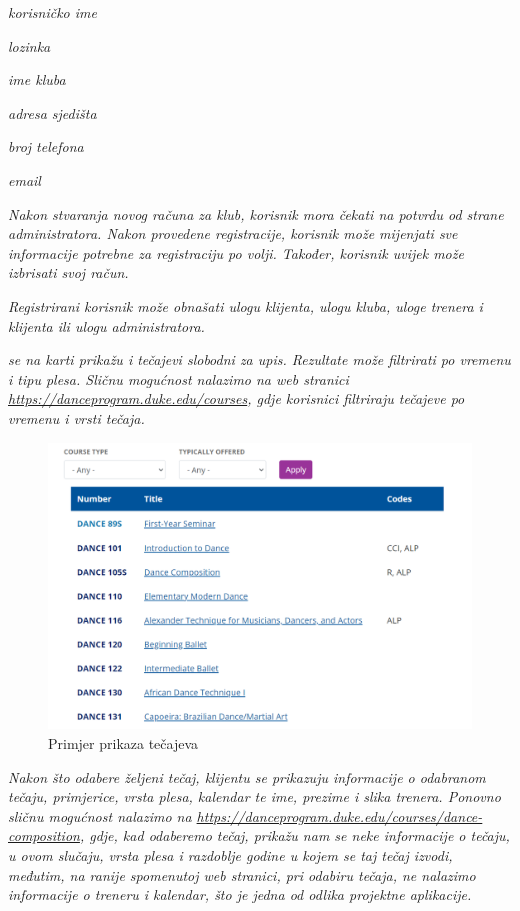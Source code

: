 \begin{packed_item}
	\item \textit{korisničko ime}
	\item \textit{lozinka}
	\item \textit{ime kluba}
	\item \textit{adresa sjedišta}
	\item \textit{broj telefona}
	\item \textit{email}
\end{packed_item}

\textit{Nakon stvaranja novog računa za klub, korisnik mora čekati na potvrdu od strane administratora.  Nakon provedene registracije, korisnik može mijenjati sve informacije potrebne za registraciju po volji. Također, korisnik uvijek može izbrisati svoj račun.}

\textit{Registrirani korisnik može obnašati ulogu klijenta, ulogu kluba, uloge trenera i klijenta ili ulogu administratora.}

\textit{ se na karti prikažu i tečajevi slobodni za upis. Rezultate može filtrirati po vremenu i tipu plesa. Sličnu mogućnost nalazimo na web stranici \url{https://danceprogram.duke.edu/courses}, gdje korisnici filtriraju tečajeve po vremenu i vrsti tečaja.}

\begin{figure}[H]
	\centering
	\includegraphics[scale=0.3]{slike/opis_1.png}
	\caption{Primjer prikaza tečajeva}
	\label{fig:screenshot001}
\end{figure}

\textit{Nakon što odabere željeni tečaj, klijentu se prikazuju informacije o odabranom tečaju, primjerice, vrsta plesa, kalendar te ime, prezime i slika trenera. Ponovno sličnu mogućnost nalazimo na \url{https://danceprogram.duke.edu/courses/dance-composition}, gdje, kad odaberemo tečaj, prikažu nam se neke informacije o tečaju, u ovom slučaju, vrsta plesa i razdoblje godine u kojem se taj tečaj izvodi, međutim, na ranije spomenutoj web stranici, pri odabiru tečaja, ne nalazimo informacije o treneru i kalendar, što je jedna od odlika projektne aplikacije.}

